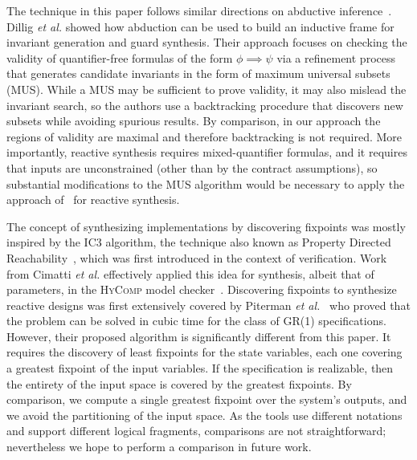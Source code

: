The technique in this paper follows similar directions on abductive inference~\cite{dillig2013inductive, dillig2014optimal}. Dillig \textit{et al.} showed how abduction can be used to build an inductive frame for invariant generation and guard synthesis. Their approach focuses on checking the validity of quantifier-free formulas of the form $\phi \implies \psi$ via a refinement process that generates candidate invariants in the form of maximum universal subsets (MUS).  While a MUS may be sufficient to prove validity, it may also mislead the invariant search, so the authors use a backtracking procedure that discovers new subsets while avoiding spurious results. By comparison, in our approach the regions of validity are maximal and therefore backtracking is not required.  More importantly, reactive synthesis requires mixed-quantifier formulas, and it requires that inputs are unconstrained (other than by the contract assumptions), so substantial modifications to the MUS algorithm would be necessary to apply the approach of~\cite{dillig2014optimal} for reactive synthesis.  %

The concept of synthesizing implementations by discovering fixpoints was mostly
inspired by the IC3 algorithm, the technique also known as Property Directed
Reachability~\cite{bradley2011sat,een2011efficient}, which was first introduced
in the context of verification. Work from Cimatti \textit{et al.} effectively
applied this idea for synthesis, albeit that of parameters, in the
\textsc{HyComp} model checker~\cite{DBLP:conf/fmcad/CimattiGMT13, cimatti2015hycomp}.
Discovering fixpoints to synthesize reactive designs was first
extensively covered by Piterman \textit{et al.}~\cite{piterman2006synthesis}
who proved that the problem can be solved in cubic time for the class of GR(1) specifications.
However, their proposed algorithm is significantly different from this paper. It
requires the discovery of least fixpoints for the state variables,
each one covering a greatest fixpoint of the input variables. If the specification
is realizable, then the entirety of the input space is covered by the greatest fixpoints. By comparison, we compute a single greatest fixpoint over the system's outputs, and we avoid the partitioning of the input space.  As the tools use different notations and support different logical fragments, comparisons are not straightforward; nevertheless we hope to perform a comparison in future work.

